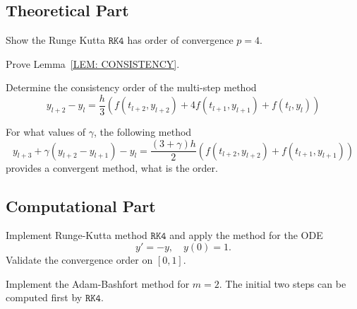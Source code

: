 \subsection{Theoretical Part}
\begin{problem}
    Show the Runge Kutta $\texttt{RK4}$ has order of convergence $p=4$.
\end{problem}
\begin{problem}
    Prove Lemma~\ref{LEM: CONSISTENCY}.
\end{problem}
\begin{problem}
    Determine the consistency order of the multi-step method 
    \begin{equation}
        y_{l+2} - y_{l} = \frac{h}{3} \left( f(t_{l+2}, y_{l+2}) + 4 f(t_{l+1}, y_{l+1}) + f(t_l, y_l) \right)
    \end{equation}
\end{problem}
\begin{problem}
    For what values of $\gamma$, the following method
    \begin{equation}
        y_{l+3} + \gamma(y_{l+2} - y_{l+1}) - y_{l} = \frac{(3 + \gamma) h}{2} \left( f(t_{l+2}, y_{l+2}) + f(t_{l+1}, y_{l+1}) \right)
    \end{equation} 
    provides a convergent method, what is the order.
\end{problem}
\subsection{Computational Part}
\begin{problem}
    Implement Runge-Kutta method $\texttt{RK4}$ and apply the method for the ODE 
    \begin{equation}
        y' = - y,\quad y(0) = 1.
    \end{equation}
    Validate the convergence order on $[0, 1]$.
\end{problem}
\begin{problem}
    Implement the Adam-Bashfort method for $m=2$. The initial two steps can be computed first by $\texttt{RK4}$.
\end{problem}

